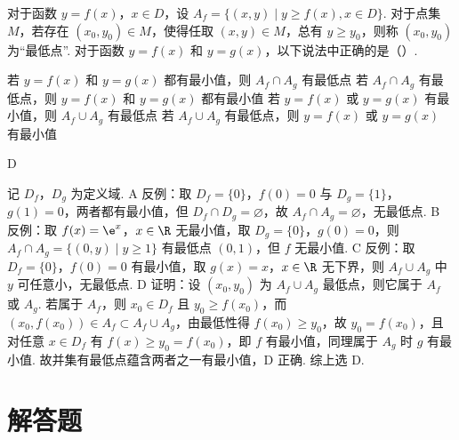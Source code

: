 \documentclass[UTF8,a4paper,oneside,11pt]{ctexbook}
\begin{document}
\begin{problem}
对于函数 \(y=f(x)\)，\(x\in D\)，设 \(A_f=\{(x,y)\mid y\ge f(x),x\in D\}\). 对于点集 \(M\)，若存在 \((x_0,y_0)\in M\)，使得任取 \((x,y)\in M\)，总有 \(y\ge y_0\)，则称 \((x_0,y_0)\) 为“最低点”. 对于函数 \(y=f(x)\) 和 \(y=g(x)\)，以下说法中正确的是（\quad）.

\choices
    {若 \(y=f(x)\) 和 \(y=g(x)\) 都有最小值，则 \(A_f\cap A_g\) 有最低点}
    {若 \(A_f\cap A_g\) 有最低点，则 \(y=f(x)\) 和 \(y=g(x)\) 都有最小值}
    {若 \(y=f(x)\) 或 \(y=g(x)\) 有最小值，则 \(A_f\cup A_g\) 有最低点}
    {若 \(A_f\cup A_g\) 有最低点，则 \(y=f(x)\) 或 \(y=g(x)\) 有最小值}
\end{problem}

\begin{answer}
D
\end{answer}

\begin{solution}
记 \(D_f\)，\(D_g\) 为定义域. A 反例：取 \(D_f=\{0\}\)，\(f(0)=0\) 与 \(D_g=\{1\}\)，\(g(1)=0\)，两者都有最小值，但 \(D_f\cap D_g=\varnothing\)，故 \(A_f\cap A_g=\varnothing\)，无最低点. B 反例：取 \(f(x)=\e^x\)，\(x\in\R\) 无最小值，取 \(D_g=\{0\}\)，\(g(0)=0\)，则 \(A_f\cap A_g=\{(0,y)\mid y\ge1\}\) 有最低点 \((0,1)\)，但 \(f\) 无最小值. C 反例：取 \(D_f=\{0\}\)，\(f(0)=0\) 有最小值，取 \(g(x)=x\)，\(x\in\R\) 无下界，则 \(A_f\cup A_g\) 中 \(y\) 可任意小，无最低点. D 证明：设 \((x_0,y_0)\) 为 \(A_f\cup A_g\) 最低点，则它属于 \(A_f\) 或 \(A_g\). 若属于 \(A_f\)，则 \(x_0\in D_f\) 且 \(y_0\ge f(x_0)\)，而 \((x_0,f(x_0))\in A_f\subset A_f\cup A_g\)，由最低性得 \(f(x_0)\ge y_0\)，故 \(y_0=f(x_0)\)，且对任意 \(x\in D_f\) 有 \(f(x)\ge y_0=f(x_0)\)，即 \(f\) 有最小值，同理属于 \(A_g\) 时 \(g\) 有最小值. 故并集有最低点蕴含两者之一有最小值，D 正确. 综上选 D.
\end{solution}

\section{解答题}
\end{document}
